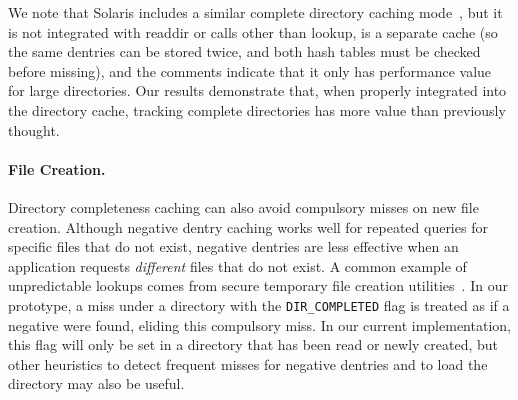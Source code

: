 
We note that Solaris includes a similar complete directory caching mode~\cite{solarisinternals},
but it is not integrated with readdir or calls other than lookup,
is a separate cache (so the same dentries can be stored twice, and both hash tables must be checked before missing),
and the comments indicate that it only has performance value for large directories.
Our results demonstrate that, when properly integrated into the directory cache,
tracking complete directories has more value than previously thought.



\paragraph{File Creation.}
Directory completeness caching can also avoid compulsory misses on new file creation.
Although negative dentry caching works well for repeated queries for specific files that do not exist,
negative dentries are less effective when an application requests 
{\em different} files that do not exist.
A common example of unpredictable lookups comes from secure temporary file creation utilities~\cite{tmpfiles}.
In our prototype, a miss under a directory with the {\tt DIR\_COMPLETED}
flag is treated as if a negative \dentry{} were found, eliding this compulsory miss.
In our current implementation, this flag will only be set in a directory that has been read 
or newly created, but other heuristics to detect frequent misses for negative dentries
and to load the directory may also be useful.



